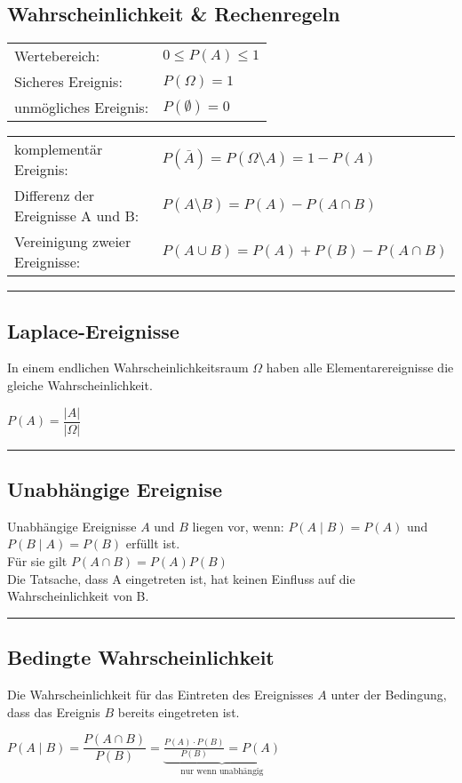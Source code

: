 	\subsection{Wahrscheinlichkeit \& Rechenregeln}
		\begin{tabular}{ll}
			Wertebereich:
			& ${0}\le{P(A)}\le{1}$\\
			Sicheres Ereignis:
			& $P(\Omega)=1$\\
			unmögliches Ereignis:
			& $P(\emptyset)=0$
		\end{tabular}
		\begin{tabular}{ll}
			komplementär Ereignis:
			&$P(\bar{A})=P({\Omega}\setminus{A})=1-P(A)$\\
			Differenz der Ereignisse A und B:
			&$P({A}\setminus{B})=P(A)-P({A}\cap{B})$\\
			Vereinigung zweier Ereignisse:
			&$P({A}\cup{B})=P(A)+P(B)-P({A}\cap{B})$
		\end{tabular}
\hrule
	
	\subsection{Laplace-Ereignisse  }
    	In einem endlichen Wahrscheinlichkeitsraum $\Omega$ haben alle
    	Elementarereignisse die gleiche Wahrscheinlichkeit.
    	\begin{center}
    	$P(A)=\dfrac{\left| A\right|}{\left|\Omega\right|}$
    	\end{center}
\hrule

	\subsection{Unabhängige Ereignise  }
		Unabhängige Ereignisse $A$ und $B$ liegen vor, wenn: \hspace*{5mm} $P(A\mid
		B)=P(A)$ \hspace{4mm} und \hspace{4mm} $P(B\mid A)=P(B)$ \hspace*{5mm} erfüllt
		ist. \\
		Für sie gilt \hspace*{5mm} $P(A\cap B)=P(A)P(B)$\\
    	Die Tatsache, dass A eingetreten ist, hat keinen Einfluss auf die 
		Wahrscheinlichkeit von B.\\
\hrule

	\subsection{Bedingte Wahrscheinlichkeit  }
		Die Wahrscheinlichkeit für das Eintreten des Ereignisses $A$ unter der
		Bedingung, dass das Ereignis $B$ bereits eingetreten ist.
		\begin{center}
		$P(A\mid B)= \dfrac{P(A\cap B)}{P(B)}=\underbrace{\frac{P(A)\cdot
		P(B)}{P(B)}=P(A)}_{\text{nur wenn unabhängig}}$ 
		\end{center}

